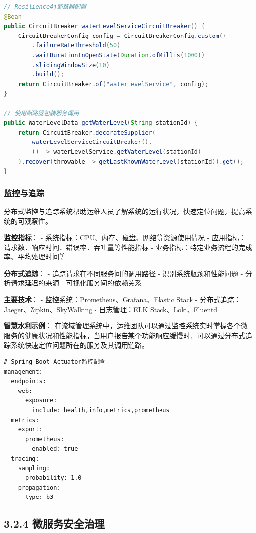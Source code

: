 \begin{lstlisting}[language=Java]
// Resilience4j断路器配置
@Bean
public CircuitBreaker waterLevelServiceCircuitBreaker() {
    CircuitBreakerConfig config = CircuitBreakerConfig.custom()
        .failureRateThreshold(50)
        .waitDurationInOpenState(Duration.ofMillis(1000))
        .slidingWindowSize(10)
        .build();
    return CircuitBreaker.of("waterLevelService", config);
}

// 使用断路器包装服务调用
public WaterLevelData getWaterLevel(String stationId) {
    return CircuitBreaker.decorateSupplier(
        waterLevelServiceCircuitBreaker(),
        () -> waterLevelService.getWaterLevel(stationId)
    ).recover(throwable -> getLastKnownWaterLevel(stationId)).get();
}
\end{lstlisting}

\subsubsection{监控与追踪}\label{ux76d1ux63a7ux4e0eux8ffdux8e2a}

分布式监控与追踪系统帮助运维人员了解系统的运行状况，快速定位问题，提高系统的可观察性。

\textbf{监控指标}： - 系统指标：CPU、内存、磁盘、网络等资源使用情况 -
应用指标：请求数、响应时间、错误率、吞吐量等性能指标 -
业务指标：特定业务流程的完成率、平均处理时间等

\textbf{分布式追踪}： - 追踪请求在不同服务间的调用路径 -
识别系统瓶颈和性能问题 - 分析请求延迟的来源 - 可视化服务间的依赖关系

\textbf{主要技术}： - 监控系统：Prometheus、Grafana、Elastic Stack -
分布式追踪：Jaeger、Zipkin、SkyWalking - 日志管理：ELK
Stack、Loki、Fluentd

\textbf{智慧水利示例}：
在流域管理系统中，运维团队可以通过监控系统实时掌握各个微服务的健康状况和性能指标，当用户报告某个功能响应缓慢时，可以通过分布式追踪系统快速定位问题所在的服务及其调用链路。

\begin{lstlisting}
# Spring Boot Actuator监控配置
management:
  endpoints:
    web:
      exposure:
        include: health,info,metrics,prometheus
  metrics:
    export:
      prometheus:
        enabled: true
  tracing:
    sampling:
      probability: 1.0
    propagation:
      type: b3
\end{lstlisting}

\subsection{3.2.4
微服务安全治理}\label{ux5faeux670dux52a1ux5b89ux5168ux6cbbux7406}

